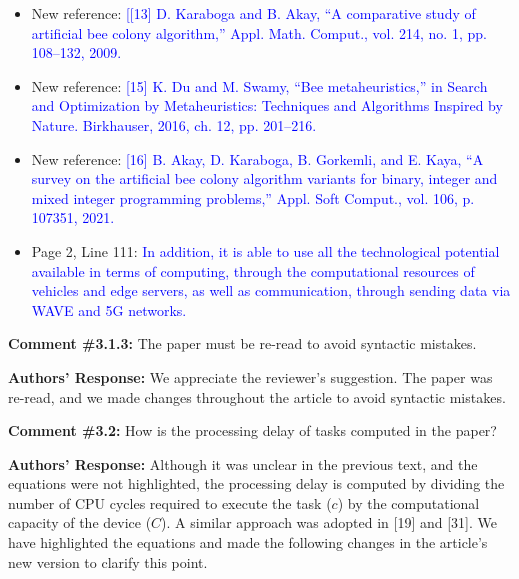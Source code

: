 \begin{itemize}
    \item New reference: \textcolor{blue}{[[13] D. Karaboga and B. Akay, “A comparative study of artificial bee colony algorithm,” Appl. Math. Comput., vol. 214, no. 1, pp. 108–132, 2009.}
    \item New reference: \textcolor{blue}{[15] K. Du and M. Swamy, “Bee metaheuristics,” in Search and Optimization by Metaheuristics: Techniques and Algorithms Inspired by Nature. Birkhauser, 2016, ch. 12, pp. 201–216.}
    \item New reference: \textcolor{blue}{[16] B. Akay, D. Karaboga, B. Gorkemli, and E. Kaya, “A survey on the artificial bee colony algorithm variants for binary, integer and mixed integer programming problems,” Appl. Soft Comput., vol. 106, p. 107351, 2021.}
    \item Page 2, Line 111: \textcolor{blue}{In addition, it is able to use all the technological potential available in terms of computing, through the computational resources of vehicles and edge servers, as well as communication, through sending data via WAVE and 5G networks.}
\end{itemize}

\vspace{\baselineskip}


\begin{mdframed}[style=review] 
\textbf{Comment \#3.1.3:} The paper must be re-read to avoid syntactic mistakes.
\end{mdframed}

\textbf{Authors' Response:} We appreciate the reviewer's suggestion. The paper was re-read, and we made changes throughout the article to avoid syntactic mistakes.


\vspace{\baselineskip}


\begin{mdframed}[style=review] 
\textbf{Comment \#3.2:} How is the processing delay of tasks computed in the paper?
\end{mdframed}

\textbf{Authors' Response:} Although it was unclear in the previous text, and the equations were not highlighted, the processing delay is computed by dividing the number of CPU cycles required to execute the task ($c$) by the computational capacity of the device ($C$). A similar approach was adopted in [19] and [31]. We have highlighted the equations and made the following changes in the article's new version to clarify this point.

